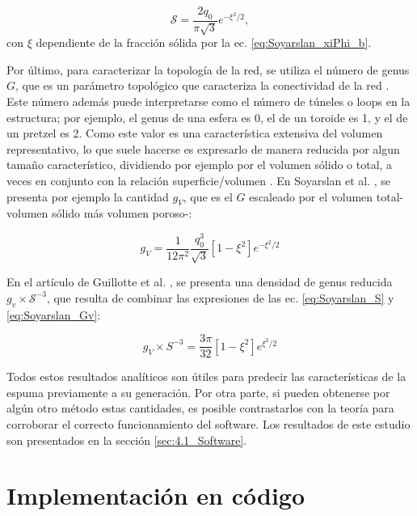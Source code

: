\documentclass{article}
\begin{document}
\begin{equation}
    \mathcal{S} = \frac{2q_0}{\pi\sqrt{3}}e^{-\xi^2/2},
    \label{eq:Soyarslan_S}
\end{equation}
con $\xi$ dependiente de la fracción sólida por la ec. \eqref{eq:Soyarslan_xiPhi_b}.

Por último, para caracterizar la topología de la red, se utiliza el número de genus $G$, que es un parámetro topológico que caracteriza la conectividad de la red \cite{munkres2000topology}. Este número además puede interpretarse como el número de túneles o loops en la estructura; por ejemplo, el genus de una esfera es 0, el de un toroide es 1, y el de un pretzel es 2. Como este valor es una característica extensiva del volumen representativo, lo que suele hacerse es expresarlo de manera reducida por algun tamaño característico, dividiendo por ejemplo por el volumen sólido o total, a veces en conjunto con la relación superficie/volumen \cite{Guillotte2019,Li2019}. En Soyarslan et al. \cite{Soyarslan2018}, se presenta por ejemplo la cantidad $g_V$, que es el $G$ escaleado por el volumen total-volumen sólido más volumen poroso-: 

\begin{equation}
    g_V = \frac{1}{12\pi^2}\frac{q_0^3}{\sqrt{3}}[1-\xi^2]e^{-\xi^2/2}
    \label{eq:Soyarslan_Gv}
\end{equation}

En el artículo de Guillotte et al. \cite{Guillotte2019}, se presenta una densidad de genus reducida $g_v\times \mathcal{S}^{-3}$, que resulta de combinar las expresiones de las ec. \eqref{eq:Soyarslan_S} y \eqref{eq:Soyarslan_Gv}:

\begin{equation}
    g_V \times S^{-3} = \frac{3\pi}{32}[1-\xi^2]e^{\xi^2/2}
    \label{eq:Pizzagalli_g_v}
\end{equation}

Todos estos resultados analíticos son útiles para predecir las características de la espuma previamente a su generación. Por otra parte, si pueden obtenerse por algún otro método estas cantidades, es posible contrastarlos con la teoría para corroborar el correcto funcionamiento del software. Los resultados de este estudio son presentados en la sección \ref{sec:4.1_Software}.

\section{Implementación en código}
\end{document}
